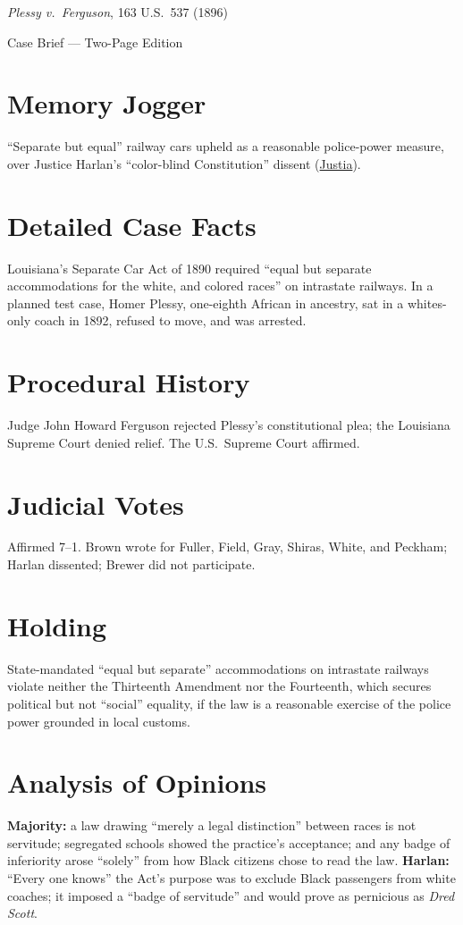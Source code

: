 \documentclass[12pt]{article}
\begin{document}
\begin{center}
{\LARGE \textit{Plessy v.\ Ferguson}, 163 U.S.\ 537 (1896)\par}
\vspace{0.5em}
{\large Case Brief --- Two-Page Edition\par}
\end{center}

\section{Memory Jogger}
``Separate but equal'' railway cars upheld as a reasonable police-power measure, over Justice Harlan's ``color-blind Constitution'' dissent (\href{https://supreme.justia.com/cases/federal/us/163/537/}{Justia}).

\section{Detailed Case Facts}
Louisiana's Separate Car Act of 1890 required ``equal but separate accommodations for the white, and colored races'' on intrastate railways. In a planned test case, Homer Plessy, one-eighth African in ancestry, sat in a whites-only coach in 1892, refused to move, and was arrested.

\section{Procedural History}
Judge John Howard Ferguson rejected Plessy's constitutional plea; the Louisiana Supreme Court denied relief. The U.S.\ Supreme Court affirmed.

\section{Judicial Votes}
Affirmed 7--1. Brown wrote for Fuller, Field, Gray, Shiras, White, and Peckham; Harlan dissented; Brewer did not participate.

\section{Holding}
State-mandated ``equal but separate'' accommodations on intrastate railways violate neither the Thirteenth Amendment nor the Fourteenth, which secures political but not ``social'' equality, if the law is a reasonable exercise of the police power grounded in local customs.

\section{Analysis of Opinions}
\textbf{Majority:} a law drawing ``merely a legal distinction'' between races is not servitude; segregated schools showed the practice's acceptance; and any badge of inferiority arose ``solely'' from how Black citizens chose to read the law. \textbf{Harlan:} ``Every one knows'' the Act's purpose was to exclude Black passengers from white coaches; it imposed a ``badge of servitude'' and would prove as pernicious as \textit{Dred Scott}.
\end{document}
